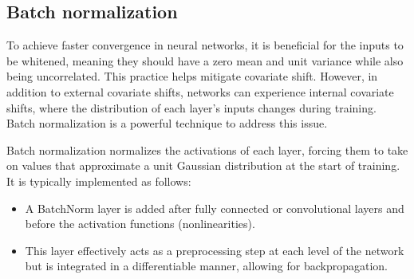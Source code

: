 \subsection{Batch normalization}
To achieve faster convergence in neural networks, it is beneficial for the inputs to be whitened, meaning they should have a zero mean and unit variance while also being uncorrelated. 
This practice helps mitigate covariate shift. 
However, in addition to external covariate shifts, networks can experience internal covariate shifts, where the distribution of each layer's inputs changes during training.
Batch normalization is a powerful technique to address this issue.

Batch normalization normalizes the activations of each layer, forcing them to take on values that approximate a unit Gaussian distribution at the start of training. 
It is typically implemented as follows:
\begin{itemize}
    \item A BatchNorm layer is added after fully connected or convolutional layers and before the activation functions (nonlinearities).
    \item This layer effectively acts as a preprocessing step at each level of the network but is integrated in a differentiable manner, allowing for backpropagation.
\end{itemize}

